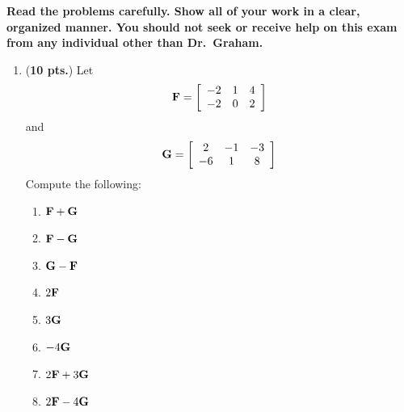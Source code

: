 \documentclass[13pt]{article}\usepackage[]{graphicx}\usepackage[]{color}
\begin{document}
{\Large{\bf Read the problems carefully. Show all of your work in a clear, organized manner. You should not seek or receive help on this exam from any individual other than Dr.\ Graham. }}

\newpage

\Large{
    \begin{enumerate}
      \item ({\bf 10 pts.}) Let
    \[ {\bf F} = \left[\begin{array}{ccc} -2 & 1 & 4 \\ -2 &  0 & 2 \end{array}\right]  \]
      and
    \[ {\bf G} = \left[\begin{array}{ccc} 2 & -1 & -3 \\ -6 & 1 & 8 \end{array}\right]  \]
    Compute the following:
    \begin{enumerate}
        \item ${\bf F + G}$
        \item ${\bf F - G}$
        \item ${\bf G - F}$
        \item $2{\bf F}$
        \item $3{\bf G}$
        \item $-4{\bf G}$
        \item $2{\bf F} + 3{\bf G}$
        \item $2{\bf F} - 4{\bf G}$
    \end{enumerate}
    
    \newpage 
    

\end{enumerate}}
\end{document}
